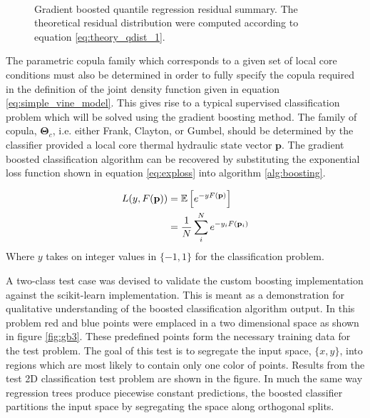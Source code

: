 \begin{figure}[H]%
    \centering
    \hspace*{-1.0em}%
    \hspace*{-1.0em}%
    \\
    \hspace*{-1.0em}%
    \hspace*{-1.0em}%
    \caption[Gradient boosted quantile regression residual summary.]{Gradient boosted quantile regression residual summary.  The theoretical residual distribution were computed according to equation \ref{eq:theory_qdist_1}.} %
    \label{fig:gb2}%
\end{figure}

The parametric copula family which corresponds to a given set of local core conditions must also be determined in order to fully specify the copula required in the definition of the joint density function given in equation \ref{eq:simple_vine_model}.   This gives rise to a typical supervised classification problem which will be solved using the gradient boosting method.  The family of copula, $\mathbf \Theta_c$, i.e. either Frank, Clayton, or Gumbel, should be determined by the classifier provided a local core thermal hydraulic state vector $\mathbf p$.   The gradient boosted classification algorithm can be recovered by substituting the exponential loss function shown in equation \ref{eq:exploss} into algorithm \ref{alg:boosting}.   

\begin{align}
L(y, F(\mathbf p)) &= \operatorname*{\mathbb{E}} \left[ e^{-yF(\mathbf p)}\right] \nonumber \\
 &= \frac{1}{N}\sum_i^N e^{-y_iF(\mathbf p_i)}
\label{eq:exploss}
\end{align}
Where $y$ takes on integer values in $\{-1, 1\}$ for the classification problem.

A two-class test case was devised to validate the custom boosting implementation against the scikit-learn implementation.   This is meant as a demonstration for qualitative understanding of the boosted classification algorithm output.  In this problem red and blue points were emplaced in a two dimensional space as shown in figure \ref{fig:gb3}.  These predefined points form the necessary training data for the test problem. The goal of this test is to segregate the input space, $\{x, y\}$, into regions which are most likely to contain only one color of points. Results from the test 2D classification test problem are shown in the figure.   In much the same way regression trees produce piecewise constant predictions, the boosted classifier partitions the input space by segregating the space along orthogonal splits.  

